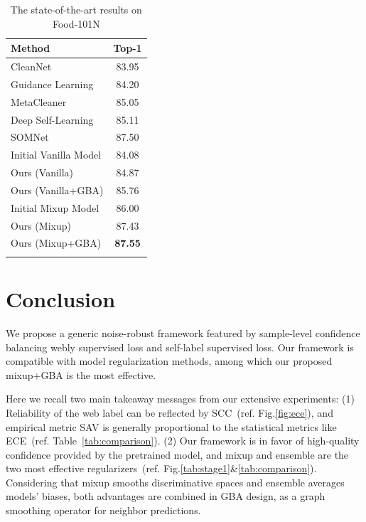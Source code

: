 \documentclass[runningheads]{llncs}
\begin{document}
\begin{table}[t!]
\caption{The state-of-the-art results on Food-101N}
\label{tab:food101N}
	\centering
	\begin{tabular}{@{\hskip 5pt}l@{\hskip 30pt}c@{\hskip 5pt}}
		\toprule
		Method & Top-1 \\
		\midrule
		CleanNet \cite{lee2018cleannet} & 83.95\\
		Guidance Learning \cite{li2019product}& 84.20\\
		MetaCleaner \cite{zhang2019metacleaner}& 85.05\\
		Deep Self-Learning \cite{han2019deep} & 85.11\\
		SOMNet \cite{tu2020learning} & 87.50\\
		\midrule
		Initial Vanilla Model &84.08\\
		Ours (Vanilla) & 84.87\\
		Ours (Vanilla+GBA) & 85.76\\
		\midrule
		Initial Mixup Model &86.00\\
		Ours (Mixup) & 87.43\\
		Ours (Mixup+GBA) & \textbf{87.55}\\
		\bottomrule
		\noalign{\bigskip}
	\end{tabular}
\end{table}

\section{Conclusion}
We propose a generic noise-robust framework featured by sample-level confidence balancing webly supervised loss and self-label supervised loss. Our framework is compatible with model regularization methods, among which our proposed mixup+GBA is the most effective. 

Here we recall two main takeaway messages from our extensive experiments:
(1) Reliability of the web label can be reflected by SCC~(ref. Fig.\ref{fig:ece}), and empirical metric SAV is generally proportional to the statistical metrics like ECE~(ref. Table~\ref{tab:comparison}).
(2) Our framework is in favor of high-quality confidence provided by the pretrained model, and mixup and ensemble are the two most effective regularizers~(ref. Fig.\ref{tab:stage1}\&\ref{tab:comparison}). Considering that mixup smooths discriminative spaces and ensemble averages models’ biases, both advantages are combined in GBA design, as a graph smoothing operator for neighbor predictions.
\end{document}
